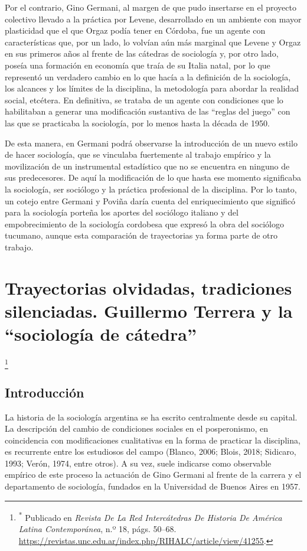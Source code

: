 Por el contrario, Gino Germani, al margen de que pudo insertarse en el proyecto colectivo llevado a la práctica por Levene, desarrollado en un ambiente con mayor plasticidad que el que Orgaz podía tener en Córdoba, fue un agente con características que, por un lado, lo volvían aún más marginal que Levene y Orgaz en sus primeros años al frente de las cátedras de sociología y, por otro lado, poseía una formación en economía que traía de su Italia natal, por lo que representó un verdadero cambio en lo que hacía a la definición de la sociología, los alcances y los límites de la disciplina, la metodología para abordar la realidad social, etcétera. En definitiva, se trataba de un agente con condiciones que lo habilitaban a generar una modificación sustantiva de las ``reglas del juego'' con las que se practicaba la sociología, por lo menos hasta la década de 1950.

De esta manera, en Germani podrá observarse la introducción de un nuevo estilo de hacer sociología, que se vinculaba fuertemente al trabajo empírico y la movilización de un instrumental estadístico que no se encuentra en ninguno de sus predecesores. De aquí la modificación de lo que hasta ese momento significaba la sociología, ser sociólogo y la práctica profesional de la disciplina. Por lo tanto, un cotejo entre Germani y Poviña daría cuenta del enriquecimiento que significó para la sociología porteña los aportes del sociólogo italiano y del empobrecimiento de la sociología cordobesa que expresó la obra del sociólogo tucumano, aunque esta comparación de trayectorias ya forma parte de otro trabajo.

\chapter{Trayectorias olvidadas, tradiciones silenciadas. Guillermo Terrera y la \enquote{sociología de cátedra}}

\footnote{\textsuperscript{*} Publicado en \emph{Revista De La Red Intercátedras De Historia De América Latina Contemporánea}, n.º 18, págs. 50--68. \url{https://revistas.unc.edu.ar/index.php/RIHALC/article/view/41255}.}

\section{Introducción}

La historia de la sociología argentina se ha escrito centralmente desde su capital. La descripción del cambio de condiciones sociales en el posperonismo, en coincidencia con modificaciones cualitativas en la forma de practicar la disciplina, es recurrente entre los estudiosos del campo (Blanco, 2006; Blois, 2018; Sidicaro, 1993; Verón, 1974, entre otros). A su vez, suele indicarse como observable empírico de este proceso la actuación de Gino Germani al frente de la carrera y el departamento de sociología, fundados en la Universidad de Buenos Aires en 1957.

